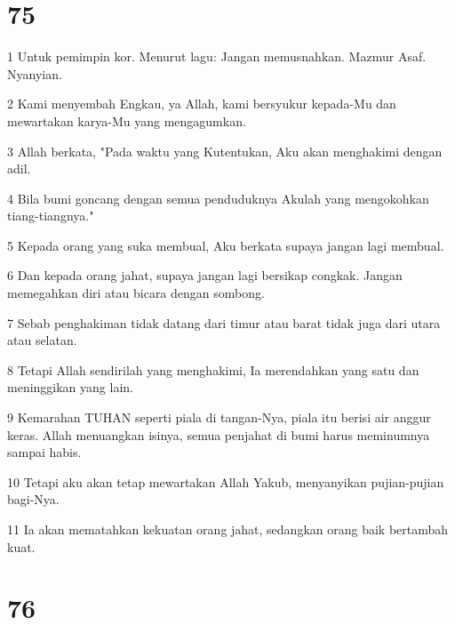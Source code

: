 \chapter{75}

\par 1 Untuk pemimpin kor. Menurut lagu: Jangan memusnahkan. Mazmur Asaf. Nyanyian.
\par 2 Kami menyembah Engkau, ya Allah, kami bersyukur kepada-Mu dan mewartakan karya-Mu yang mengagumkan.
\par 3 Allah berkata, "Pada waktu yang Kutentukan, Aku akan menghakimi dengan adil.
\par 4 Bila bumi goncang dengan semua penduduknya Akulah yang mengokohkan tiang-tiangnya."
\par 5 Kepada orang yang suka membual, Aku berkata supaya jangan lagi membual.
\par 6 Dan kepada orang jahat, supaya jangan lagi bersikap congkak. Jangan memegahkan diri atau bicara dengan sombong.
\par 7 Sebab penghakiman tidak datang dari timur atau barat tidak juga dari utara atau selatan.
\par 8 Tetapi Allah sendirilah yang menghakimi, Ia merendahkan yang satu dan meninggikan yang lain.
\par 9 Kemarahan TUHAN seperti piala di tangan-Nya, piala itu berisi air anggur keras. Allah menuangkan isinya, semua penjahat di bumi harus meminumnya sampai habis.
\par 10 Tetapi aku akan tetap mewartakan Allah Yakub, menyanyikan pujian-pujian bagi-Nya.
\par 11 Ia akan mematahkan kekuatan orang jahat, sedangkan orang baik bertambah kuat.

\chapter{76}


